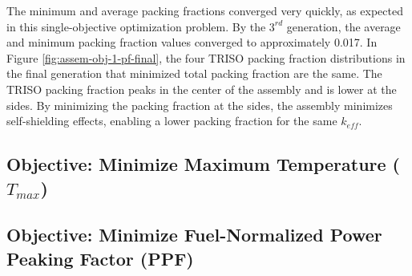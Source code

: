 The minimum and average packing fractions converged very quickly, as expected 
in this single-objective optimization problem.
By the $3^{rd}$ generation, the average and minimum packing fraction
values converged to approximately 0.017. 
In Figure \ref{fig:assem-obj-1-pf-final}, the four TRISO packing fraction distributions in the
final generation that minimized total packing fraction are the same.
The TRISO packing fraction peaks in the center of the assembly and is lower at the sides. 
By minimizing the packing fraction at the sides, the assembly minimizes self-shielding effects, 
enabling a lower packing fraction for the same $k_{eff}$. 

\subsection{Objective: Minimize Maximum Temperature ($T_{max}$)}

\subsection{Objective: Minimize Fuel-Normalized Power Peaking Factor (PPF)}
